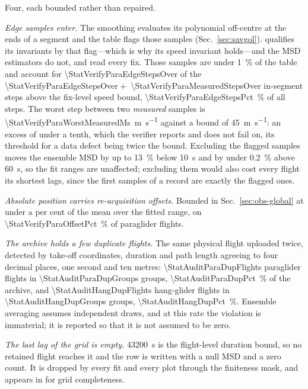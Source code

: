 \begin{revblock}
Four, each bounded rather than repaired.

\emph{Edge samples enter.} The smoothing evaluates its polynomial off-centre at the ends
of a segment and the table flags those samples  (Sec.~\ref{sec:savgol}).
 qualifies its invariants by that flag---which is why its speed
invariant holds---and the MSD estimators do not, and read every fix. Those samples are
under \SI{1}{\percent} of the table and account for
\num{\StatVerifyParaEdgeStepsOver} of the \num{\StatVerifyParaEdgeStepsOver}${}+{}$%
\num{\StatVerifyParaMeasuredStepsOver} in-segment steps above the fix-level speed bound,
\SI{\StatVerifyParaEdgeStepsPct}{\percent} of all steps. The worst step between two
\emph{measured} samples is \SI{\StatVerifyParaWorstMeasuredMs}{\metre\per\second} against
a bound of \SI{45}{\metre\per\second}: an excess of under a tenth, which the verifier
reports and does not fail on, its threshold for a data defect being twice the bound.
Excluding the flagged samples moves the ensemble MSD by up to \SI{13}{\percent} below
\SI{10}{\second} and by under \SI{0.2}{\percent} above \SI{60}{\second}, so the fit ranges
are unaffected; excluding them would also cost every flight its shortest lags, since the
first samples of a record are exactly the flagged ones.

\emph{Absolute position carries re-acquisition offsets.} Bounded in
Sec.~\ref{sec:obs-global} at under a per cent of the mean over the fitted range, on
\SI{\StatVerifyParaOffsetPct}{\percent} of paraglider flights.

\emph{The archive holds a few duplicate flights.} The same physical flight uploaded
twice, detected by take-off coordinates, duration and path length agreeing to four
decimal places, one second and ten metres:
\num{\StatAuditParaDupFlights} paraglider flights in
\num{\StatAuditParaDupGroups} groups, \SI{\StatAuditParaDupPct}{\percent} of the archive,
and \num{\StatAuditHangDupFlights} hang-glider flights in \num{\StatAuditHangDupGroups}
groups, \SI{\StatAuditHangDupPct}{\percent}. Ensemble averaging
assumes independent draws, and at this rate the violation is immaterial; it is reported so
that it is not assumed to be zero.

\emph{The last lag of the grid is empty.} \SI{43200}{\second} is the flight-level
duration bound, so no retained flight reaches it and the row is written with a null MSD
and a zero count. It is dropped by every fit and every plot through the finiteness mask,
and appears in  for grid completeness.
\end{revblock}

\paragraph{} 
